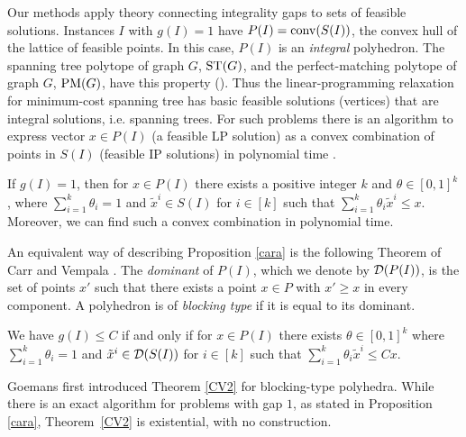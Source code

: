 Our methods apply theory connecting integrality gaps to sets of feasible solutions. Instances $I$ with $g(I)=1$ have $P(I)=\operatorname{conv}(S(I))$, the convex hull of the lattice of feasible points. In this case, $P(I)$ is an \textit{integral} polyhedron. The spanning tree polytope of graph $G$, $\operatorname{ST}(G)$, and the perfect-matching polytope of graph $G$, $\operatorname{{{PM}}}(G)$, have this property (\cite{Edmonds2003,edmondsPM}). Thus the linear-programming relaxation for minimum-cost spanning tree has basic feasible solutions (vertices) that are integral solutions, i.e. spanning trees. For such problems there is an algorithm to express vector $x\in P(I)$ (a feasible LP solution) as a convex combination of points in $S(I)$ (feasible IP solutions) in polynomial time \cite{cons-cara}.

\begin{proposition}\label{cara}
	If $g(I)=1$, then for $x\in P(I)$ there exists a positive integer $k$ and $\theta \in [0,1]^k$, where $\sum_{i=1}^{k}\theta_i =1$ and $\tilde{x}^i\in S(I)$ for $i\in [k]$ such that $\sum_{i=1}^{k}\theta_i \tilde{x}^i\leq x$. Moreover, we can find such a convex combination in polynomial time.
\end{proposition}

An equivalent way of describing Proposition \ref{cara} is the following Theorem of Carr and Vempala \cite{Carr2004}. The {\em dominant} of $P(I)$, which we denote by $\operatorname{\mathcal{D}}(P(I))$, is the set of points $x'$ such that there exists a point $x\in P$ with $x'\geq x$ in every component. A polyhedron is of \textit{blocking type} if it is equal to its dominant.

\begin{thm} \label{CV2}
	We have $g(I) \leq C$ if and only if for  $x\in P(I)$ there exists $\theta \in [0,1]^k$ where $\sum_{i=1}^{k}\theta_i =1$ and $\tilde{x}^i\in \operatorname{\mathcal{D}}(S(I))$ for $i\in [k]$ such that $\sum_{i=1}^{k}\theta_i \tilde{x}^i\leq Cx$.
\end{thm}
Goemans \cite{goemansblocking} first introduced Theorem \ref{CV2} for blocking-type polyhedra. While there is an exact algorithm for problems with gap $1$, as stated in Proposition \ref{cara}, Theorem~\ref{CV2} is existential, with no construction.
\iffalse

